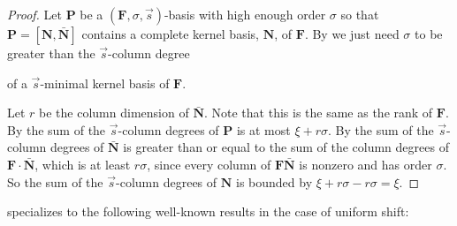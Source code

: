 \begin{proof}
Let $\mathbf{P}$ be a $(\mathbf{F},\sigma,\vec{s})$-basis with high
enough order $\sigma$ so that $\mathbf{P}=\left[\mathbf{N},\bar{\mathbf{N}}\right]$
contains a complete kernel basis, $\mathbf{N}$, of $\mathbf{F}$.
By  we just need
$\sigma$ to be greater than the $\vec{s}$-column degree %
\begin{comment}
$\delta$ 
\end{comment}
of a $\vec{s}$-minimal kernel basis of $\mathbf{F}$. %
\begin{comment}
To see this, let $k$ be the column dimension of any kernel basis
of $\mathbf{F}$, and $\mathbf{P}'$ be the submatrix of $\mathbf{P}$
consists of the columns with the $k$ lowest $\vec{s}$-column degrees.
Note that the minimality of $\mathbf{P}$ implies that the $\vec{s}$-column
degrees of $\mathbf{P}'$ are no more that of any $\vec{s}$-minimal
kernel basis of $\mathbf{F}$. For any column $\mathbf{p}$ of $\mathbf{P}'$
we also have $\deg\mathbf{F}\mathbf{p}\le\deg_{\vec{s}}\mathbf{p}$
by \prettyref{lem:boundOnDegreesOfFA}. Hence we have $\deg\mathbf{F}\mathbf{p}\le\deg_{\vec{s}}\mathbf{p}\le\delta<\sigma$.
Combining this with the fact that $\mathbf{F}\mathbf{p}\equiv0\mod x^{\sigma}$
we get $\mathbf{F}\mathbf{p}=0$, which means $\mathbf{P}'$, whose
$k$ columns are linearly independent, is also a kernel basis of $\mathbf{F}$.
In fact, although not needed for the proof of this theorem, it is
not difficult to show from here that $\mathbf{P}'$ is in fact a $\vec{s}$-minimal
kernel basis because its $\vec{s}$-column degrees are no more than
that of a $\vec{s}$-minimal kernel basis of $\mathbf{F}$. 
\end{comment}
Let $r$ be the column dimension of $\bar{\mathbf{N}}$. Note that
this is the same as the rank of $\mathbf{F}$. By 
the sum of the $\vec{s}$-column degrees of $\mathbf{P}$ is at most
$\xi+r\sigma$. By  the sum of
the $\vec{s}$-column degrees of $\bar{\mathbf{N}}$ is greater than
or equal to the sum of the column degrees of $\mathbf{F}\cdot\bar{\mathbf{N}}$,
which is at least $r\sigma$, since every column of $\mathbf{F}\bar{\mathbf{N}}$
is nonzero and has order $\sigma$. So the sum of the $\vec{s}$-column
degrees of $\mathbf{N}$ is bounded by $\xi+r\sigma-r\sigma=\xi$. 
\end{proof}
 specializes
to the following well-known results in the case of uniform shift:
